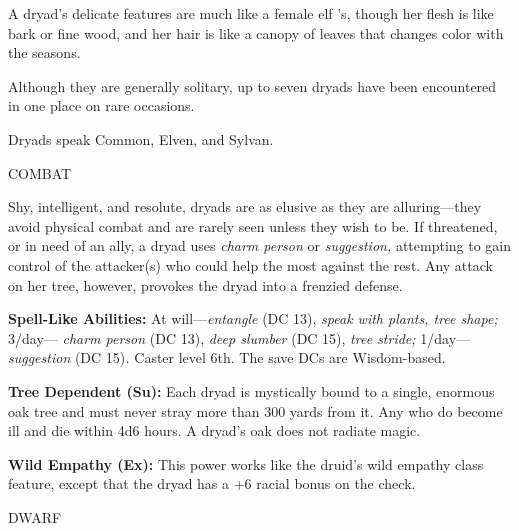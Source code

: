 \documentclass{article}
\begin{document}
{A dryad's delicate features are much like a female elf 's, though her flesh is 
like bark or fine wood, and her hair is like a canopy of leaves that changes color 
with the seasons. 

Although they are generally solitary, up to seven dryads have been encountered 
in one place on rare occasions.

Dryads speak Common, Elven, and Sylvan.

COMBAT

Shy, intelligent, and resolute, dryads are as elusive as they are alluring---they 
avoid physical combat and are rarely seen unless they wish to be. If threatened, 
or in need of an ally, a dryad uses \textit{charm person }or \textit{suggestion, 
}attempting to gain control of the attacker(s) who could help the most against 
the rest. Any attack on her tree, however, provokes the dryad into a frenzied defense.

\textbf{Spell-Like Abilities:} At will---\textit{entangle }(DC 13), \textit{speak 
with plants, tree shape; }3/day--- \textit{charm person }(DC 13), \textit{deep 
slumber }(DC 15), \textit{tree stride; }1/day---\textit{suggestion }(DC 15)\textit{. 
}Caster level 6th. The save DCs are Wisdom-based.

\textbf{Tree Dependent (Su): }Each dryad is mystically bound to a single, enormous 
oak tree and must never stray more than 300 yards from it. Any who do become ill 
and die within 4d6 hours. A dryad's oak does not radiate magic. 

\textbf{Wild Empathy (Ex):} This power works like the druid's wild empathy class 
feature, except that the dryad has a +6 racial bonus on the check.

\vspace{12pt}
{\LARGE{}DWARF}

}
\end{document}
